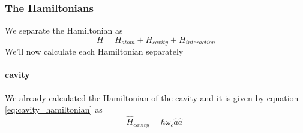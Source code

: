\subsubsection{The Hamiltonians} \label{sec:the-hamiltonians}
We separate the Hamiltonian as
\[
    H = H_{atom} + H_{cavity} + H_{interaction}
\]
We'll now calculate each Hamiltonian separately

\paragraph*{cavity}
We already calculated the Hamiltonian of the cavity and it is given by equation \ref{eq:cavity_hamiltonian} as
\begin{equation}
    \boxed{\hat{H}_{cavity} = \hbar\omega_c\hat{a}\hat{a}^\dag}
\end{equation}


